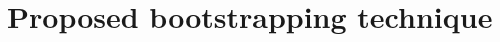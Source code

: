 \section{Proposed bootstrapping technique}
\label{sec-our-technique}

\cite{Strandh:2015:ELS:Environments}
